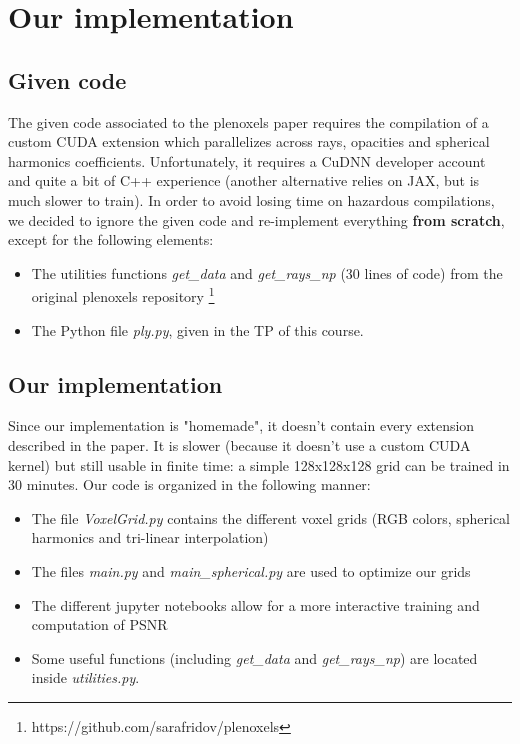 \documentclass{article}
\begin{document}
\section{Our implementation}

\subsection{Given code}


The given code associated to the plenoxels paper requires the compilation of a custom CUDA extension which parallelizes across rays, opacities and spherical harmonics coefficients. Unfortunately, it requires a CuDNN developer account and quite a bit of C++ experience (another alternative relies on JAX, but is much slower to train). In order to avoid losing time on hazardous compilations, we decided to ignore the given code and re-implement everything \textbf{from scratch}, except for the following elements:
\begin{itemize}
\item The utilities functions \textit{get\_data} and \textit{get\_rays\_np} (30 lines of code) from the original plenoxels repository \footnote{https://github.com/sarafridov/plenoxels}

\item The Python file \textit{ply.py}, given in the TP of this course.  

\end{itemize}

\subsection{Our implementation}


Since our implementation is "homemade", it doesn't contain every extension described in the paper. It is slower (because it doesn't use a custom CUDA kernel) but still usable in finite time: a simple 128x128x128 grid can be trained in 30 minutes. Our code is organized in the following manner:


\begin{itemize}
\item The file \textit{VoxelGrid.py} contains the different voxel grids (RGB colors, spherical harmonics and tri-linear interpolation) 
\item The files \textit{main.py} and \textit{main\_spherical.py} are used to optimize our grids
\item The different jupyter notebooks allow for a more interactive training and computation of PSNR
\item Some useful functions (including \textit{get\_data} and \textit{get\_rays\_np}) are located inside \textit{utilities.py}.
\end{itemize}
\end{document}
